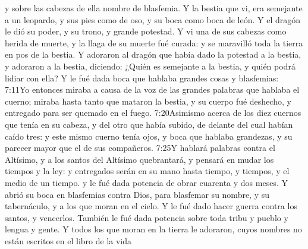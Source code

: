  y sobre las cabezas de ella nombre de blasfemia.
Y la bestia que vi, era semejante a un leopardo, y sus pies como de oso, y su boca como boca de león. Y el dragón le dió su poder, y su trono, y grande potestad. 
Y vi una de sus cabezas como herida de muerte, y la llaga de su muerte fué curada: y se maravilló toda la tierra en pos de la bestia. 
Y adoraron al dragón que había dado la potestad a la bestia, y adoraron a la bestia, diciendo: ¿Quién es semejante a la bestia,
 y quién podrá lidiar con ella? 
Y le fué dada boca que hablaba grandes cosas y blasfemias:%
				       {7:11}{Yo entonces miraba a causa de la voz de las grandes palabras que hablaba el cuerno; miraba hasta tanto que mataron la bestia, y su cuerpo fué deshecho, y entregado para ser quemado en el fuego.}%
					   {7:20}{Asimismo acerca de los diez cuernos que tenía en su cabeza, y del otro que había subido, de delante del cual habían caído tres: y este mismo cuerno tenía ojos, y boca que hablaba grandezas, y su parecer mayor que el de sus compañeros.}
					   {7:25}{Y hablará palabras contra el Altísimo, y a los santos del Altísimo quebrantará, y pensará en mudar los tiempos y la ley: y entregados serán en su mano hasta tiempo, y tiempos, y el medio de un tiempo.}
 y le fué dada potencia de obrar cuarenta y dos meses. 
Y abrió su boca en blasfemias contra Dios, para blasfemar su nombre, y su tabernáculo, y a los que moran en el cielo.%
Y le fué dado hacer guerra contra los santos, y vencerlos. También le fué dada potencia sobre toda tribu y pueblo y lengua y gente. 
Y todos los que moran en la tierra le adoraron, cuyos nombres no están escritos en el libro de la vida%
